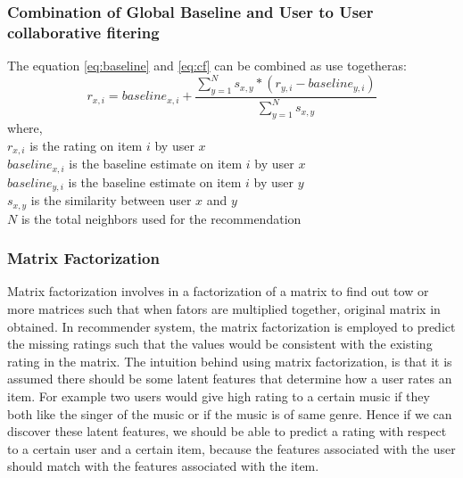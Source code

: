 \subsubsection{Combination of Global Baseline and User to User collaborative fitering}
The equation \ref{eq:baseline} and \ref{eq:cf} can be combined as use togetheras:
\begin{equation}
	r_{x,i} = baseline_{x,i}+\frac{\sum_{y=1}^N s_{x,y}*(r_{y,i}-baseline_{y,i})}{\sum_{y=1}^N s_{x,y}}
\end{equation}
where,\\
$r_{x,i}$ is the rating on item $i$ by user $x$ \\
$baseline_{x,i}$ is the baseline estimate on item $i$ by user $x$ \\
$baseline_{y,i}$ is the baseline estimate on item $i$ by user $y$ \\
$s_{x,y}$ is the similarity between user $x$ and $y$ \\ 
$N$ is the total neighbors used for the recommendation
\subsubsection{Matrix Factorization}
Matrix factorization \cite{latent} involves in a factorization of a matrix to find out tow or more matrices such that when fators are multiplied together, original matrix in obtained. In recommender system, the matrix factorization is employed to predict the missing ratings such that the values would be consistent with the existing rating in the matrix. The intuition behind using matrix factorization, is that it is assumed there should be some latent features that determine how a user rates an item. For example two users would give high rating to a certain music if they both like the singer of the music or if the music is of same genre. Hence if we can discover these latent features, we should be able to predict a rating with respect to a certain user and a certain item, because the features associated with the user should match with the features associated with the item.

